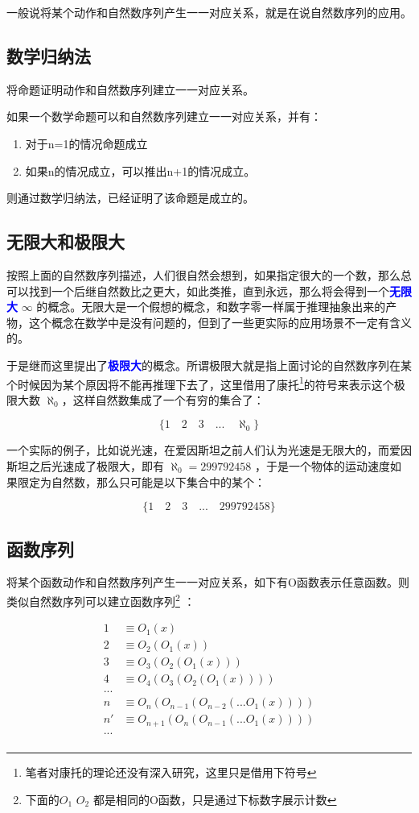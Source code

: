 \documentclass[12pt,oneside]{book}
\renewcommand{\emph}[1]{\textcolor{blue}{\textbf{#1}}}
\begin{document}
一般说将某个动作和自然数序列产生一一对应关系，就是在说自然数序列的应用。


\subsection{数学归纳法}
将命题证明动作和自然数序列建立一一对应关系。

如果一个数学命题可以和自然数序列建立一一对应关系，并有：

\begin{enumerate}
\item 对于n=1的情况命题成立
\item 如果n的情况成立，可以推出n+1的情况成立。
\end{enumerate}

则通过数学归纳法，已经证明了该命题是成立的。


\subsection{无限大和极限大}
按照上面的自然数序列描述，人们很自然会想到，如果指定很大的一个数，那么总可以找到一个后继自然数比之更大，如此类推，直到永远，那么将会得到一个\emph{无限大} $\infty$ 的概念。无限大是一个假想的概念，和数字零一样属于推理抽象出来的产物，这个概念在数学中是没有问题的，但到了一些更实际的应用场景不一定有含义的。

于是继而这里提出了\emph{极限大}的概念。所谓极限大就是指上面讨论的自然数序列在某个时候因为某个原因将不能再推理下去了，这里借用了康托\footnote{笔者对康托的理论还没有深入研究，这里只是借用下符号}的符号来表示这个极限大数 $\aleph_0$，这样自然数集成了一个有穷的集合了：

\[
\{1 \quad 2 \quad 3 \quad  ...  \quad \aleph_0\}
\]

一个实际的例子，比如说光速，在爱因斯坦之前人们认为光速是无限大的，而爱因斯坦之后光速成了极限大，即有 $\aleph_0=299792458$ ，于是一个物体的运动速度如果限定为自然数，那么只可能是以下集合中的某个：

\[
\{1 \quad 2 \quad 3 \quad  ...  \quad 299792458\}
\]

\subsection{函数序列}
将某个函数动作和自然数序列产生一一对应关系，如下有O函数表示任意函数。则类似自然数序列可以建立函数序列\footnote{下面的$O_1$ $O_2$ 都是相同的O函数，只是通过下标数字展示计数} ：

\begin{align*}
1 &\equiv O_1(x) \\
2 &\equiv O_2(O_1(x)) \\
3 &\equiv O_3(O_2(O_1(x))) \\
4 &\equiv O_4(O_3(O_2(O_1(x)))) \\
...\\
n &\equiv O_n(O_{n-1}(O_{n-2}(...O_1(x)))) \\
n' &\equiv O_{n+1}(O_n(O_{n-1}(...O_1(x))))\\
...\\
\end{align*}
\end{document}
